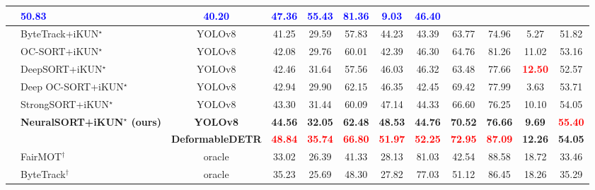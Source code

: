 \documentclass[10pt,twocolumn,letterpaper]{article}
\begin{document}
\begin{table}[t]
\begin{center}
{\begin{tabular}{cl|c|c|c|c|c|c|c|c|c|c}
            & \textcolor{blue}{\textbf{50.83}} & \textcolor{blue}{\textbf{40.20}} & \textcolor{blue}{\textbf{47.36}} & \textcolor{blue}{\textbf{55.43}} 
            & \textcolor{blue}{\textbf{81.36}} & \textcolor{blue}{\textbf{9.03}}  & \textcolor{blue}{\textbf{46.40}} \\
            \hline
            & ByteTrack\cite{zhang2022bytetrack}+iKUN$^\star$     & YOLOv8 \cite{Jocher_YOLO_by_Ultralytics_2023} & 41.25 & 29.59 & 57.83 & 44.23 & 43.39 & 63.77 & 74.96 & 5.27  & 51.82 \\ 
            & OC-SORT\cite{cao2023observation}+iKUN$^\star$       & YOLOv8 \cite{Jocher_YOLO_by_Ultralytics_2023} & 42.08 & 29.76 & 60.01 & 42.39 & 46.30 & 64.76 & 81.26 & 11.02 & 53.16 \\
            & DeepSORT\cite{wojke2017simple}+iKUN$^\star$         & YOLOv8 \cite{Jocher_YOLO_by_Ultralytics_2023} & 42.46 & 31.64 & 57.56 & 46.03 & 46.32 & 63.48 & 77.66 & \textcolor{red}{\textbf{12.50}} & 52.57 \\
            & Deep OC-SORT\cite{maggiolino2023deep}+iKUN$^\star$  & YOLOv8 \cite{Jocher_YOLO_by_Ultralytics_2023} & 42.94 & 29.90 & 62.15 & 46.35 & 42.45 & 69.42 & 77.99 & 3.63  & 53.71 \\ 
            & StrongSORT\cite{du2023strongsort}+iKUN$^\star$      & YOLOv8 \cite{Jocher_YOLO_by_Ultralytics_2023} & 43.30 & 31.44 & 60.09 & 47.14 & 44.33 & 66.60 & 76.25 & 10.10 & 54.05 \\ 
            \hline
            & \textbf{NeuralSORT+iKUN$^\star$ (ours)}             & \textbf{YOLOv8 \cite{Jocher_YOLO_by_Ultralytics_2023}} 
            & \textbf{44.56} & \textbf{32.05} & \textbf{62.48} & \textbf{48.53} & \textbf{44.76} & \textbf{70.52} & \textbf{76.66} & \textbf{9.69}  & \textcolor{red}{\textbf{55.40}} \\
            &                                                     & \textbf{DeformableDETR \cite{zhu2020deformable}}       
            & \textcolor{red}{\textbf{48.84}} & \textcolor{red}{\textbf{35.74}} & \textcolor{red}{\textbf{66.80}} & \textcolor{red}{\textbf{51.97}} 
            & \textcolor{red}{\textbf{52.25}} & \textcolor{red}{\textbf{72.95}} & \textcolor{red}{\textbf{87.09}} & \textbf{12.26} & \textbf{54.05} \\
            \hline
            & FairMOT$^\dagger$   \cite{zhang2021fairmot}         & oracle                                        & 33.02 & 26.39 & 41.33 & 28.13 & 81.03 & 42.54 & 88.58 & 18.72 & 33.46 \\
            & ByteTrack$^\dagger$ \cite{zhang2022bytetrack}       & oracle                                        & 35.23 & 25.69 & 48.30 & 27.82 & 77.03 & 51.12 & 86.45 & 18.26 & 35.29 \\

\end{tabular}}
\end{center}
\end{table}
\end{document}
